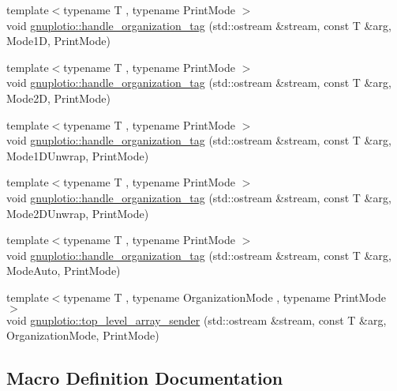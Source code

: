\begin{DoxyCompactItemize}
\item 
{\footnotesize template$<$typename T , typename Print\+Mode $>$ }\\void \hyperlink{namespacegnuplotio_af809657552a53c3b17f0400a5c210a7f}{gnuplotio\+::handle\+\_\+organization\+\_\+tag} (std\+::ostream \&stream, const T \&arg, Mode1D, Print\+Mode)
\item 
{\footnotesize template$<$typename T , typename Print\+Mode $>$ }\\void \hyperlink{namespacegnuplotio_a1310221abf0551a805d4482f0612317b}{gnuplotio\+::handle\+\_\+organization\+\_\+tag} (std\+::ostream \&stream, const T \&arg, Mode2D, Print\+Mode)
\item 
{\footnotesize template$<$typename T , typename Print\+Mode $>$ }\\void \hyperlink{namespacegnuplotio_a99e6125b97bc2ca4241f6275d83f05d4}{gnuplotio\+::handle\+\_\+organization\+\_\+tag} (std\+::ostream \&stream, const T \&arg, Mode1\+D\+Unwrap, Print\+Mode)
\item 
{\footnotesize template$<$typename T , typename Print\+Mode $>$ }\\void \hyperlink{namespacegnuplotio_a9d2cee7a7f2ed9748a0f135b206836d3}{gnuplotio\+::handle\+\_\+organization\+\_\+tag} (std\+::ostream \&stream, const T \&arg, Mode2\+D\+Unwrap, Print\+Mode)
\item 
{\footnotesize template$<$typename T , typename Print\+Mode $>$ }\\void \hyperlink{namespacegnuplotio_affc9cb6a9b6e5630523f0dbf8acdfcc2}{gnuplotio\+::handle\+\_\+organization\+\_\+tag} (std\+::ostream \&stream, const T \&arg, Mode\+Auto, Print\+Mode)
\item 
{\footnotesize template$<$typename T , typename Organization\+Mode , typename Print\+Mode $>$ }\\void \hyperlink{namespacegnuplotio_a1e452d861932700749421ce103ef8d48}{gnuplotio\+::top\+\_\+level\+\_\+array\+\_\+sender} (std\+::ostream \&stream, const T \&arg, Organization\+Mode, Print\+Mode)
\end{DoxyCompactItemize}


\subsection{Macro Definition Documentation}
